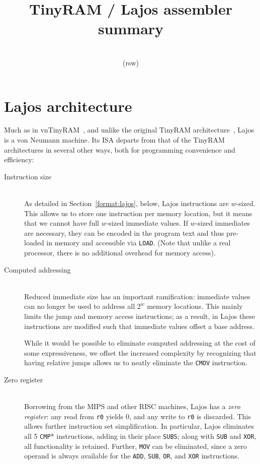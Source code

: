 \documentclass[10pt,letterpaper]{article}
\author{\vspace*{-8ex}\\(rsw)\number\year\twodigit{\number\month}\twodigit{\number\day}}
\date{\vspace*{-8ex}}
\title{\vspace*{-6ex}TinyRAM / Lajos assembler summary}
\begin{document}
\maketitle

\thispagestyle{empty}

\section{Lajos architecture}

Much as in vnTinyRAM~\cite{vnTinyRAM}, and unlike the original TinyRAM architecture~\cite{TinyRAM}, Lajos is a von Neumann machine. Its ISA departs from that of the TinyRAM architectures in several other ways, both for programming convenience and efficiency:

\begin{description}
    \item[Instruction size]
        \hfill\\As detailed in Section~\ref{format:lajos}, below, Lajos instructions are $w$-sized. This allows us to store one instruction per memory location, but it means that we cannot have full $w$-sized immediate values. If $w$-sized immediates are necessary, they can be encoded in the program text and thus pre-loaded in memory and accessible via \texttt{LOAD}. (Note that unlike a real processor, there is no additional overhead for memory access).

    \item[Computed addressing]
        \hfill\\Reduced immediate size has an important ramification: immediate values can no longer be used to address all $2^w$ memory locations. This mainly limits the jump and memory access instructions; as a result, in Lajos these instructions are modified such that immediate values offset a base address.

While it would be possible to eliminate computed addressing at the cost of some expressiveness, we offset the increased complexity by recognizing that having relative jumps allows us to neatly eliminate the \texttt{CMOV} instruction.

    \item[Zero register]
        \hfill\\Borrowing from the MIPS and other RISC machines, Lajos has a \emph{zero register}: any read from \texttt{r0} yields 0, and any write to \texttt{r0} is discarded. This allows further instruction set simplification. In particular, Lajos eliminates all 5 \texttt{CMP}* instructions, adding in their place \texttt{SUBS}; along with \texttt{SUB} and \texttt{XOR}, all functionality is retained. Further, \texttt{MOV} can be eliminated, since a zero operand is always available for the \texttt{ADD}, \texttt{SUB}, \texttt{OR}, and \texttt{XOR} instructions.


\end{description}
\end{document}
